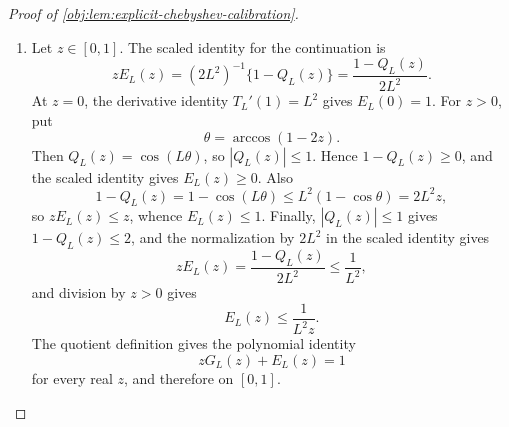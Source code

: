 \documentclass[11pt]{article}
\begin{document}
\begin{proof}[Proof of \cref{obj:lem:explicit-chebyshev-calibration}]
\begin{enumerate}
The cross-arm square bound follows by the product structure. For \(j\in\mathscr I_L\), independence and \((K_{1-a})_1=K_{1-a}\) give
\[
\mathbb E\left(\frac{K_{1-a}(K_a)_j}{\mathscr D^{j+1}}\right)^2
=
\mathbb E\left(\frac{(K_a)_j}{\mathscr D^j}\right)^2
\mathbb E\left(\frac{(K_{1-a})_1}{\mathscr D}\right)^2.
\]
Applying the one-dimensional estimate to arm \(a\) with orders \((j,j)\) and to arm \(1-a\) with orders \((1,1)\) yields
\[
\mathbb E\left(\frac{K_{1-a}(K_a)_j}{\mathscr D^{j+1}}\right)^2
\le
3^L\left(1+\frac{s_a}{B}\right)^{2j}
\cdot
3^L\left(1+\frac{s_{1-a}}{B}\right)^2.
\]
Now \(1+s_a/B\le\eta\), \(1+s_{1-a}/B\le\eta\), \(\eta\ge1\), and \(2j+2\le2L\). Hence
\[
\left(1+\frac{s_a}{B}\right)^{2j}
\left(1+\frac{s_{1-a}}{B}\right)^2
\le
\eta^{2j+2}
\le
\eta^{2L},
\]
and therefore
\[
\mathbb E\left(\frac{K_{1-a}(K_a)_j}{\mathscr D^{j+1}}\right)^2
\le
9^L\eta^{2L}.
\]
Since \((\xi+\upsilon)^2\le2\xi^2+2\upsilon^2\),
\[
\mathbb E X_j(K)^2
\le
2\cdot 3^L\eta^{2L}+2\cdot 9^L\eta^{2L}
\le
36^L\eta^{2L}
=
\bigl(6^L\eta^L\bigr)^2 .
\]
The finite-sum \(L^2\) inequality
\[
\mathbb E\left(\sum_{j\in\mathscr I_L} c_jX_j\right)^2
\le
\left(\sum_{j\in\mathscr I_L}|c_j|\right)^2
\max_{j\in\mathscr I_L}\mathbb E X_j^2
\]
therefore yields
\[
\mathbb E\widehat W_{a,L}^2
\le
\|G_L\|_1^2\bigl(6^L\eta^L\bigr)^2
\le
(6^L)^2\bigl(6^L\eta^L\bigr)^2
=
1296^L\eta^{2L}.
\]
Because \(1296\le7056\),
\[
\mathbb E\widehat W_{a,L}^2
\le
7056^L\left(1+\frac pB\right)^{2L}.
\]
If \(p\le B\), then \(\eta\le2\), and hence
\[
\mathbb E\widehat W_{a,L}^2
\le
1296^L2^{2L}
=
5184^L
\le
7056^L .
\]
This proves both second-moment assertions. %

\item Let \(z\in[0,1]\). The scaled identity for the continuation is
\[
zE_L(z)=(2L^2)^{-1}\{1-Q_L(z)\}=
\frac{1-Q_L(z)}{2L^2}.
\]
At \(z=0\), the derivative identity \(T_L'(1)=L^2\) gives \(E_L(0)=1\). For \(z>0\), put
\[
\theta=\arccos(1-2z).
\]
Then \(Q_L(z)=\cos(L\theta)\), so \(|Q_L(z)|\le1\). Hence \(1-Q_L(z)\ge0\), and the scaled identity gives \(E_L(z)\ge0\). Also
\[
1-Q_L(z)
=
1-\cos(L\theta)
\le
L^2(1-\cos\theta)
=
2L^2z,
\]
so \(zE_L(z)\le z\), whence \(E_L(z)\le1\). Finally, \(|Q_L(z)|\le1\) gives \(1-Q_L(z)\le2\), and the normalization by \(2L^2\) in the scaled identity gives
\[
zE_L(z)
=
\frac{1-Q_L(z)}{2L^2}
\le
\frac1{L^2},
\]
and division by \(z>0\) gives
\[
E_L(z)\le\frac1{L^2z}.
\]
The quotient definition gives the polynomial identity
\[
zG_L(z)+E_L(z)=1
\]
for every real \(z\), and therefore on \([0,1]\). %
\end{enumerate}
\end{proof}
\end{document}

